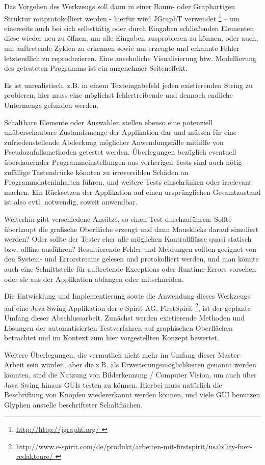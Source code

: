 Das Vorgehen des Werkzeugs soll dann in einer Baum- oder Graphartigen
Struktur mitprotokolliert werden - hierfür wird JGraphT verwendet \footnote{\url{ http://http://jgrapht.org/ }} --
um einerseits auch bei sich selbsttätig oder durch Eingaben schließenden Elementen diese wieder
neu zu öffnen, um alle Eingaben ausprobieren zu können, oder auch, um auftretende Zyklen 
zu erkennen sowie um erzeugte und erkannte Fehler letztendlich zu reproduzieren.
Eine ansehnliche Visualisierung btw. Modellierung des getesteten Programms ist ein angenehmer
Seiteneffekt.

Es ist unrealistisch, z.B. in
einem Texteingabefeld jeden existierenden String zu probieren, hier muss eine möglichst
fehlertreibende und dennoch endliche Untermenge gefunden werden.

Schaltbare Elemente oder Auswahlen stellen ebenso
eine potenziell unüberschaubare Zustandsmenge der Applikation dar und müssen für eine
zufriedenstellende Abdeckung möglicher Anwendungsfälle mithilfe von
Pseudozufallsmethoden getestet werden. Überlegungen bezüglich eventuell überdauernder Programmeinstellungen
aus vorherigen Tests sind auch nötig -- zufällige Tastendrücke könnten zu irreversiblen Schäden an
Programmdateninhalten führen, und weitere Tests einschränken oder irrelevant machen. Ein Rücksetzen
der Applikation auf einen ursprünglichen Gesamtzustand ist also evtl. notwendig, soweit anwendbar.
 
Weiterhin gibt verschiedene Ansätze, so einen Test durchzuführen: Sollte überhaupt die
grafische Oberfläche erzeugt und dann Mausklicks darauf simuliert werden? Oder sollte der
Tester eher alle möglichen Kontrollflüsse quasi statisch bzw. offline ausführen? Resultierende
Fehler und Meldungen sollten geeignet von den System- und Errorstreams gelesen und
protokolliert werden, und man könnte auch eine Schnittstelle für auftretende Exceptions oder
Runtime-Errors vorsehen oder sie aus der Applikation abfangen oder mitschneiden. 
 
Die Entwicklung und Implementierung sowie die Anwendung dieses Werkzeugs auf eine Java-Swing-Applikation
der e-Spirit AG, FirstSpirit 
\footnote{\url{ http://www.e-spirit.com/de/produkt/arbeiten-mit-firstspirit/usability-fuer-redakteure/ }}, 
ist der geplante 
Umfang dieser Abschlussarbeit. Zunächst werden existierende Methoden und Lösungen der automatisierten
Testverfahren auf graphischen Oberflächen betrachtet und im Kontext zum hier vorgestellten Konzept
bewertet.
 
Weitere Überlegungen, die vermutlich nicht mehr im Umfang dieser Master-Arbeit sein
würden, aber die z.B. als Erweiterungsmöglichkeiten genannt werden könnten, sind die
Nutzung von Bilderkennung / Computer Vision, um auch über Java Swing hinaus GUIs testen zu
können. Hierbei muss natürlich die Beschriftung von Knöpfen wiedererkannt werden können,
und viele GUI benutzen Glyphen anstelle beschrifteter Schaltflächen. 
